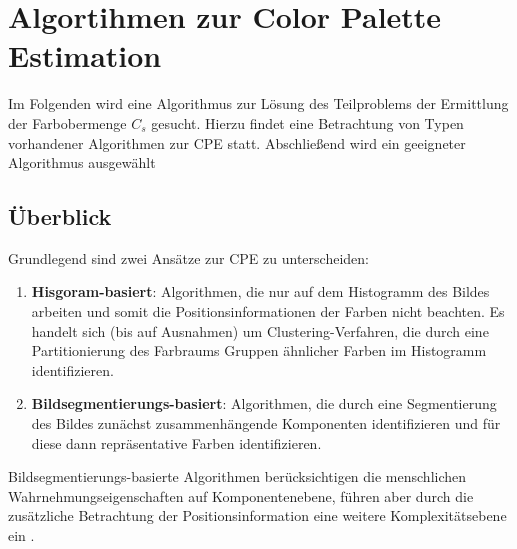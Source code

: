 \documentclass[10pt,a4paper,bibliography=totoc,twocolumn]{scrartcl}
\begin{document}
\section{Algortihmen zur Color Palette Estimation}

Im Folgenden wird eine Algorithmus zur Lösung des Teilproblems der Ermittlung der Farbobermenge $C_s$ gesucht. Hierzu findet eine Betrachtung von Typen vorhandener Algorithmen zur CPE statt. Abschließend wird ein geeigneter Algorithmus ausgewählt

\subsection{Überblick}

Grundlegend sind zwei Ansätze zur CPE zu unterscheiden:
\begin{enumerate}
    \item \textbf{Hisgoram-basiert}: Algorithmen, die nur auf dem Histogramm des Bildes arbeiten und somit die Positionsinformationen der Farben nicht beachten. Es handelt sich (bis auf Ausnahmen) um Clustering-Verfahren, die durch eine Partitionierung des Farbraums Gruppen ähnlicher Farben im Histogramm identifizieren.
    \item \textbf{Bildsegmentierungs-basiert}: Algorithmen, die durch eine Segmentierung des Bildes zunächst zusammenhängende Komponenten identifizieren und für diese dann repräsentative Farben identifizieren.
\end{enumerate}


Bildsegmentierungs-basierte Algorithmen berücksichtigen die menschlichen Wahrnehmungseigenschaften auf Komponentenebene, führen aber durch die zusätzliche Betrachtung der Positionsinformation eine weitere Komplexitätsebene ein \citep{colorthemes}.
\end{document}
